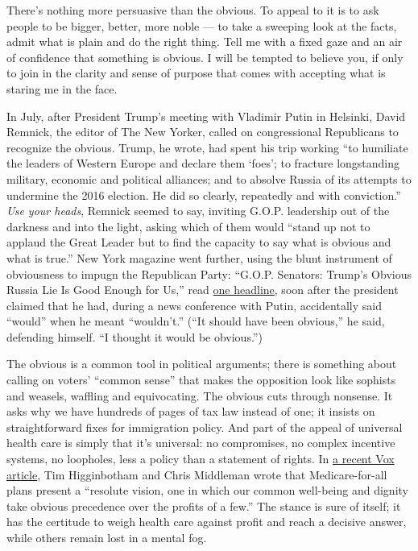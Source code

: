 There's nothing more persuasive than the obvious. To appeal to it is to
ask people to be bigger, better, more noble --- to take a sweeping look
at the facts, admit what is plain and do the right thing. Tell me with a
fixed gaze and an air of confidence that something is obvious. I will be
tempted to believe you, if only to join in the clarity and sense of
purpose that comes with accepting what is staring me in the face.

In July, after President Trump's meeting with Vladimir Putin in
Helsinki, David Remnick, the editor of The New Yorker, called on
congressional Republicans to recognize the obvious. Trump, he wrote, had
spent his trip working ``to humiliate the leaders of Western Europe and
declare them `foes'; to fracture longstanding military, economic and
political alliances; and to absolve Russia of its attempts to undermine
the 2016 election. He did so clearly, repeatedly and with conviction.''
\emph{Use your heads}, Remnick seemed to say, inviting G.O.P. leadership
out of the darkness and into the light, asking which of them would
``stand up not to applaud the Great Leader but to find the capacity to
say what is obvious and what is true.'' New York magazine went further,
using the blunt instrument of obviousness to impugn the Republican
Party: ``G.O.P. Senators: Trump's Obvious Russia Lie Is Good Enough for
Us,'' read
\href{http://nymag.com/daily/intelligencer/2018/07/gop-senators-trumps-obvious-russia-lie-good-enough-for-us.html}{one
headline}, soon after the president claimed that he had, during a news
conference with Putin, accidentally said ``would'' when he meant
``wouldn't.'' (``It should have been obvious,'' he said, defending
himself. ``I thought it would be obvious.'')

The obvious is a common tool in political arguments; there is something
about calling on voters' ``common sense'' that makes the opposition look
like sophists and weasels, waffling and equivocating. The obvious cuts
through nonsense. It asks why we have hundreds of pages of tax law
instead of one; it insists on straightforward fixes for immigration
policy. And part of the appeal of universal health care is simply that
it's universal: no compromises, no complex incentive systems, no
loopholes, less a policy than a statement of rights. In
\href{https://www.vox.com/the-big-idea/2018/7/13/17567952/medicare-for-all-centrists-copycat-plans-water-down-left-center-sanders}{a
recent Vox article}, Tim Higginbotham and Chris Middleman wrote that
Medicare-for-all plans present a ``resolute vision, one in which our
common well-being and dignity take obvious precedence over the profits
of a few.'' The stance is sure of itself; it has the certitude to weigh
health care against profit and reach a decisive answer, while others
remain lost in a mental fog.

